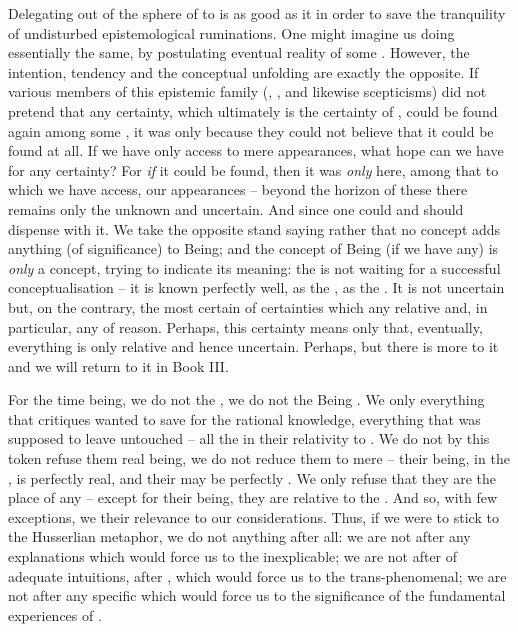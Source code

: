 \pa Delegating  out of the sphere of  to  is as good as  it in order to save the
tranquility of undisturbed epistemological ruminations.  One might imagine us
doing essentially the same, by postulating eventual reality of some
.  However, the intention, tendency and the conceptual
unfolding are exactly the opposite.  If various members of this epistemic family
(, , and likewise scepticisms) did not
pretend that any certainty, which ultimately is the certainty of ,
could be found again among some , it was only because they could not
believe that it could be found at all. If we have only access to mere
appearances, what hope can we have for any certainty? For {\em if} it could be
found, then it was {\em only} here, among that to which we have access, our
appearances -- beyond the horizon of these   there
remains only the unknown and uncertain.  And since  one could and should dispense with it.  We take the
opposite stand saying rather that no concept adds anything (of significance) to
Being; and the concept of Being (if we have any) is {\em only} a concept, trying
to indicate its meaning: the  is not  waiting for a
  successful conceptualisation -- it is known
perfectly well, as the , as the . It is not
uncertain but, on the contrary, the most certain of certainties which
 any relative  and, in particular, any
   of reason.  Perhaps, this
certainty means only that, eventually, everything  is only relative
and hence uncertain. Perhaps, but there is more to it and we will return to it
in Book III.
  
For the time being, we do not  the , we do not
 the Being  . We only 
everything that critiques wanted to save for the rational knowledge, everything
that  was supposed to leave untouched -- all the
 in their relativity to . We do not by this token
refuse them real being, we do not reduce them to mere 
-- their being,  in the , is perfectly real, and their
 may be perfectly . We only refuse that they are the
place of any   -- except for their being, they are
relative to the . And so, with few exceptions, we
 their relevance to our considerations.  Thus, if we were to stick
to the Husserlian metaphor, we do not  anything after all: we are
not after any  explanations which would force us to 
the inexplicable; we are not after  of adequate intuitions, after
, which would force us to  the trans-phenomenal; we are
not after any specific  which would force us to  the
significance of the fundamental experiences of .

